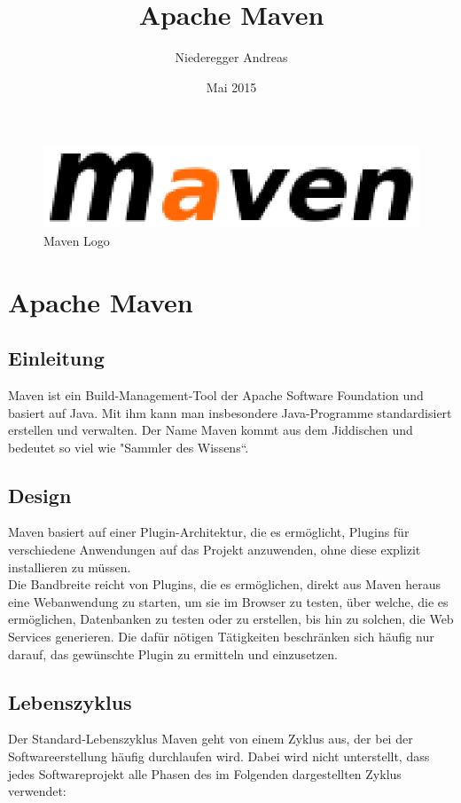 \title{Apache Maven} 
\author{Niederegger Andreas }
\date{Mai 2015}

\maketitle


\begin{figure}[h]
\centering
\includegraphics{MavenLogo.eps}
\caption{Maven Logo}
\label{fig:MavenLogo}
\end{figure}
\section{Apache Maven}
\subsection{Einleitung}
Maven ist ein Build-Management-Tool der Apache Software Foundation und basiert auf Java. Mit ihm kann man insbesondere Java-Programme standardisiert erstellen und verwalten.
Der Name Maven kommt aus dem Jiddischen und bedeutet so viel wie "Sammler des Wissens“.

\subsection{Design}
Maven basiert auf einer Plugin-Architektur, die es ermöglicht, Plugins für verschiedene Anwendungen auf das Projekt anzuwenden, ohne diese explizit installieren zu müssen. 
\\Die Bandbreite reicht von Plugins, die es ermöglichen, direkt aus Maven heraus eine Webanwendung zu starten, um sie im Browser zu testen, über welche, die es ermöglichen, Datenbanken zu testen oder zu erstellen, bis hin zu solchen, die Web Services generieren. Die dafür nötigen Tätigkeiten beschränken sich häufig nur darauf, das gewünschte Plugin zu ermitteln und einzusetzen.
\newpage
\subsection{Lebenszyklus}
Der Standard-Lebenszyklus
Maven geht von einem Zyklus aus, der bei der Softwareerstellung häufig durchlaufen wird. Dabei wird nicht unterstellt, dass jedes Softwareprojekt alle Phasen des im Folgenden dargestellten Zyklus verwendet:

